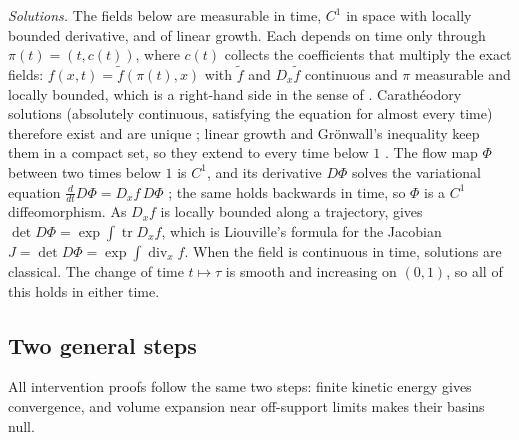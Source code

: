 \documentclass{article} %
\makeatletter
\newif\ificlr
\newcommand{\placeblock}[1]{\ificlr\@nameuse{moved@#1}\fi}
\theoremstyle{plain}
\theoremstyle{definition}
\theoremstyle{remark}
\makeatother
\begin{document}
\emph{Solutions.} The fields below are measurable in time, $C^1$ in space with locally bounded
derivative, and of linear growth. Each depends on time only through $\pi(t)=(t,c(t))$, where
$c(t)$ collects the coefficients that multiply the exact fields: $f(x,t)=\tilde f(\pi(t),x)$
with $\tilde f$ and $D_x\tilde f$ continuous and $\pi$ measurable and locally bounded, which is a
right-hand side in the sense of \citet[Definition~2.6.1]{sontag1998mathematical}. Carath\'eodory
solutions (absolutely continuous, satisfying the equation for almost every time) therefore exist
and are unique \citep[Theorem~54]{sontag1998mathematical}; linear growth and Gr\"onwall's
inequality keep them in a compact set, so they extend to every time below $1$
\citep[Proposition~C.3.6]{sontag1998mathematical}. The flow map $\Phi$ between two times below $1$
is $C^1$, and its derivative $D\Phi$ solves the variational equation
$\tfrac{d}{dt}D\Phi=D_xf\,D\Phi$ \citep[Theorem~1 and Remark~2.8.1]{sontag1998mathematical}; the
same holds backwards in time, so $\Phi$ is a $C^1$ diffeomorphism. As $D_xf$ is locally bounded
along a trajectory, \citet[Lemma/Exercise~C.4.1(f)]{sontag1998mathematical} gives
$\det D\Phi=\exp\int\operatorname{tr}D_xf$, which is Liouville's formula for the Jacobian
$J=\det D\Phi=\exp\int\operatorname{div}_xf$. When the field is continuous in time, solutions are
classical. The change of time $t\mapsto\tau$ is smooth and increasing on $(0,1)$, so all of this
holds in either time.

\subsection{Two general steps}
\label{apx:general-steps}

All intervention proofs follow the same two steps: finite kinetic energy gives convergence, and
volume expansion near off-support limits makes their basins null.
\placeblock{template}
\end{document}
